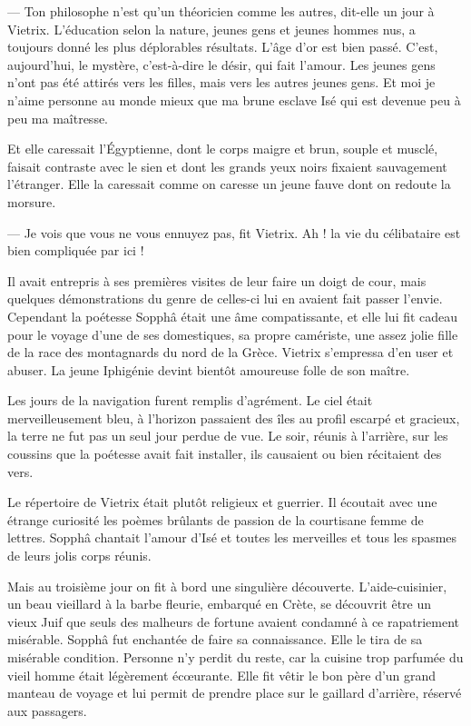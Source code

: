 \documentclass[a4paper, 11pt, oneside, polutonikogreek, french]{article}
\begin{document}
--- Ton philosophe n'est qu'un théoricien comme les autres, dit-elle un jour à Vietrix. L'éducation selon la nature, jeunes gens et jeunes hommes nus, a toujours donné les plus déplorables résultats. L'âge d'or est bien passé. C'est, aujourd'hui, le mystère, c'est-à-dire le désir, qui fait l'amour. Les jeunes gens n'ont pas été attirés vers les filles, mais vers les autres jeunes gens. Et moi je n'aime personne au monde mieux que ma brune esclave Isé qui est devenue peu à peu ma maîtresse.

Et elle caressait l'Égyptienne, dont le corps maigre et brun, souple et musclé, faisait contraste avec le sien et dont les grands yeux noirs fixaient sauvagement l'étranger. Elle la caressait comme on caresse un jeune fauve dont on redoute la morsure.

--- Je vois que vous ne vous ennuyez pas, fit Vietrix. Ah ! la vie du célibataire est bien compliquée par ici !

Il avait entrepris à ses premières visites de leur faire un doigt de cour, mais quelques démonstrations du genre de celles-ci lui en avaient fait passer l'envie. Cependant la poétesse Sopphâ était une âme compatissante, et elle lui fit cadeau pour le voyage d'une de ses domestiques, sa propre camériste, une assez jolie fille de la race des montagnards du nord de la Grèce. Vietrix s'empressa d'en user et abuser. La jeune Iphigénie devint bientôt amoureuse folle de son maître.

\bigskip
\centerline{\EightStarTaper}
\centerline{\EightStarTaper\EightStarTaper}
\bigskip

Les jours de la navigation furent remplis d'agrément. Le ciel était merveilleusement bleu, à l'horizon passaient des îles au profil escarpé et gracieux, la terre ne fut pas un seul jour perdue de vue. Le soir, réunis à l'arrière, sur les coussins que la poétesse avait fait installer, ils causaient ou bien récitaient des vers.

Le répertoire de Vietrix était plutôt religieux et guerrier. Il écoutait avec une étrange curiosité les poèmes brûlants de passion de la courtisane femme de lettres. Sopphâ chantait l'amour d'Isé et toutes les merveilles et tous les spasmes de leurs jolis corps réunis.

\bigskip
\centerline{\EightStarTaper}
\centerline{\EightStarTaper\EightStarTaper}
\bigskip

Mais au troisième jour on fit à bord une singulière découverte. L'aide-cuisinier, un beau vieillard à la barbe fleurie, embarqué en Crète, se découvrit être un vieux Juif que seuls des malheurs de fortune avaient condamné à ce rapatriement misérable. Sopphâ fut enchantée de faire sa connaissance. Elle le tira de sa misérable condition. Personne n'y perdit du reste, car la cuisine trop parfumée du vieil homme était légèrement écœurante. Elle fit vêtir le bon père d'un grand manteau de voyage et lui permit de prendre place sur le gaillard d'arrière, réservé aux passagers.
\clearpage
\end{document}
